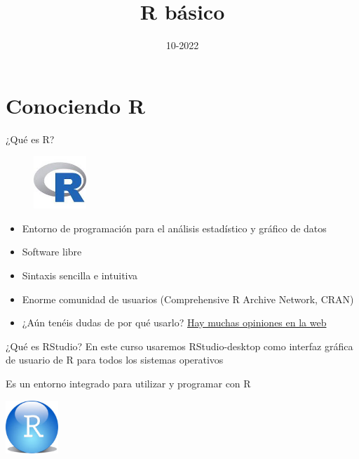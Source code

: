 \documentclass[
  ignorenonframetext,
  aspectratio=169]{beamer}
\title{R básico}
\author{}
\date{\vspace{-2.5em}10-2022}
\providecommand{\tightlist}{%
  \setlength{\itemsep}{0pt}\setlength{\parskip}{0pt}}
\begin{document}
\frame{\titlepage}

\begin{frame}[allowframebreaks]
  \tableofcontents[hideallsubsections]
\end{frame}
\hypertarget{conociendo-r}{%
\section{Conociendo R}\label{conociendo-r}}

\begin{frame}{¿Qué es R?}
\protect\hypertarget{quuxe9-es-r}{}
\begin{figure}
\includegraphics[width=75px]{Imgs/Rlogo} \end{figure}

\begin{itemize}
\tightlist
\item
  Entorno de programación para el análisis estadístico y gráfico de
  datos
\item
  Software libre
\item
  Sintaxis sencilla e intuitiva
\item
  Enorme comunidad de usuarios (Comprehensive R Archive Network, CRAN)
\item
  ¿Aún tenéis dudas de por qué usarlo?
  \href{https://www.google.com/search?q=Why+use+R\&rlz=1C1CHBF_esES891ES891\&sxsrf=ALiCzsY4-woeo8PpPd0yw3j3b8guwp9zZQ\%3A1664188143209\&ei=734xY5C1DOaIur4PjI2XoAU\&ved=0ahUKEwjQ6PX4n7L6AhVmhM4BHYzGBVQQ4dUDCA4\&uact=5\&oq=Why+use+R\&gs_lcp=Cgdnd3Mtd2l6EAMyCggAEEcQ1gQQsAMyCggAEEcQ1gQQsAMyCggAEEcQ1gQQsAMyCggAEEcQ1gQQsAMyCggAEEcQ1gQQsAMyCggAEEcQ1gQQsAMyCggAEEcQ1gQQsAMyCggAEEcQ1gQQsAMyBwgAELADEENKBAhBGABKBAhGGABQAFgAYIMMaAFwAHgAgAEAiAEAkgEAmAEAyAEJwAEB\&sclient=gws-wiz}{Hay
  muchas opiniones en la web}
\end{itemize}
\end{frame}

\begin{frame}{¿Qué es RStudio?}
\protect\hypertarget{quuxe9-es-rstudio}{}
En este curso usaremos RStudio-desktop como interfaz gráfica de usuario
de R para todos los sistemas operativos

Es un entorno integrado para utilizar y programar con R

\begin{center}\includegraphics[width=75px]{Imgs/RSLogo} \end{center}
\end{frame}
\end{document}
